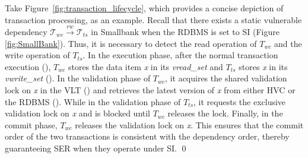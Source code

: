 \begin{example}
    Take Figure~\ref{fig:transaction_lifecycle}, which provides a concise depiction of transaction processing, as an example. Recall that there exists a static vulnerable dependency $\mathcal{T}_{wc} \xrightarrow{rw} \mathcal{T}_{ts}$ in Smallbank when the RDBMS is set to SI (Figure \ref{fig:SmallBank}). Thus, it is necessary to detect the read operation of $T_{wc}$ and the write operation of $T_{ts}$. 
    In the execution phase, after the normal transaction execution (), $T_{wc}$ stores the data item \textit{x} in its \textit{vread\_set} and $T_{ts}$ stores \textit{x} in its \textit{vwrite\_set} (). 
    In the validation phase of $T_{wc}$, it acquires the shared validation lock on \textit{x} in the VLT () and retrieves the latest version of \textit{x} from either HVC or the RDBMS (). 
    While in the validation phase of $T_{ts}$, it requests the exclusive validation lock on \textit{x} and is blocked until $T_{wc}$ releases the lock. 
    Finally, in the commit phase, $T_{wc}$ releases the validation lock on \textit{x}. This ensures that the commit order of the two transactions is consistent with the dependency order, thereby guaranteeing SER when they operate under SI.
    \qed
\end{example}


